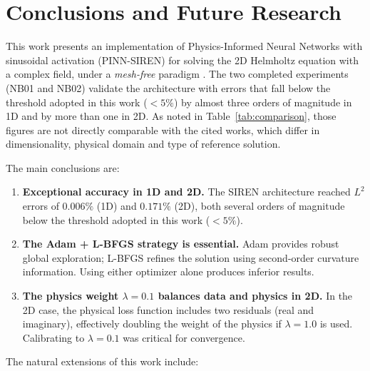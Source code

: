 
\section{Conclusions and Future Research}
\label{sec:conclusions}

This work presents an implementation of Physics-Informed Neural Networks with
sinusoidal activation (PINN-SIREN) for solving the 2D Helmholtz equation with a
complex field, under a \textit{mesh-free} paradigm
\cite{Karniadakis2021_review, Cuomo2022_review}.
The two completed experiments (NB01 and NB02) validate the architecture with
errors that fall below the threshold adopted in this work ($<5\%$) by almost
three orders of magnitude in 1D and by more than one in 2D. As noted in
Table~\ref{tab:comparison}, those figures are not directly comparable with the
cited works, which differ in dimensionality, physical domain and type of
reference solution.

The main conclusions are:

\begin{enumerate}
  \item \textbf{Exceptional accuracy in 1D and 2D.}
    The SIREN architecture reached $L^2$ errors of $0.006\%$ (1D) and $0.171\%$ (2D),
    both several orders of magnitude below the threshold adopted in this work
    ($< 5\%$).

  \item \textbf{The Adam + L-BFGS strategy is essential.}
    Adam provides robust global exploration; L-BFGS refines the solution using
    second-order curvature information.
    Using either optimizer alone produces inferior results.

  \item \textbf{The physics weight $\lambda = 0.1$ balances data and physics in 2D.}
    In the 2D case, the physical loss function includes two residuals (real and
    imaginary), effectively doubling the weight of the physics if $\lambda = 1.0$ is
    used.
    Calibrating to $\lambda = 0.1$ was critical for convergence.
\end{enumerate}

The natural extensions of this work include:

